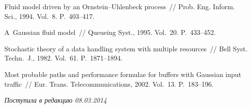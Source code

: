 \begin{multicols}{2}
{{\begin{thebibliography}{99}
Fluid model driven by an Ornstein--Uhlenbeck process~//
{Prob. Eng. Inform. Sci.}, 1994.
Vol.~8. P.~403--417.

A~Gaussian fluid model~// Queueing Syst.,  1995. Vol.~20. P.~433--452.

Stochastic theory of a data handling system with multiple resources~//
Bell Syst. Techn.~J.,  1982. Vol.~61. P.~1871--1894.



 Most probable paths and performance
formulae for buffers with Gaussian input traffic~//
Eur. Trans. Telecommunications, 2002. Vol.~13. P.~183--196.


 \label{end\stat}

\end{thebibliography}
} }

\end{multicols}



\hfill{\small\textit{Поступила в редакцию 08.03.2014}}
\renewcommand{\figurename}{\protect\bf Рис.}